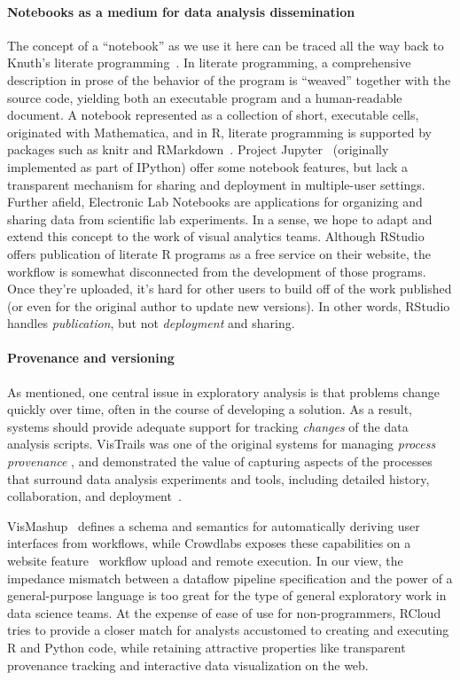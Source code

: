 \paragraph*{Notebooks as a medium for data analysis dissemination}
The concept of a ``notebook'' as we use it here can be traced all the
way back to Knuth's literate programming~\cite{Knuth:1984:LP}. In
literate programming, a comprehensive description in prose of the
behavior of the program is ``weaved'' together with the source code,
yielding both an executable program and a human-readable document.
A notebook represented as a collection of short, executable cells,
originated with Mathematica, and in R, literate programming is
supported by packages such as knitr and RMarkdown~\cite{Xie:2013:DDW}.
Project Jupyter~\cite{jupyter} (originally implemented as part of
IPython) offer some notebook features, but lack a transparent
mechanism for sharing and deployment in multiple-user settings.
%
Further afield, {Electronic Lab Notebooks} are applications for organizing
and sharing data from scientific lab experiments\cite{Rubacha:2011:ELN}.
In a sense, we hope to adapt and extend this concept to the work of
visual analytics teams.
%
Although RStudio offers publication of literate R programs as a free
service on their website, the workflow is somewhat disconnected from
the development of those programs. Once they're uploaded, it's hard
for other users to build off of the work published (or even for the
original author to update new versions). In other words, RStudio
handles \emph{publication}, but not \emph{deployment} and sharing.

\paragraph*{Provenance and versioning} As
mentioned, one central issue in exploratory analysis is that
problems change quickly over time, often in the course of developing a
solution. As a result, systems should provide adequate support for
tracking \emph{changes} of the data analysis scripts. VisTrails was
one of the original systems for managing \emph{process provenance} ,
and demonstrated the value of capturing aspects of the processes that
surround data analysis experiments and tools, including detailed
history, collaboration, and deployment~\cite{Callahan:2006:VVM}.

VisMashup~\cite{Santos:2009:VST} defines a schema and
semantics for automatically deriving user interfaces from workflows,
while Crowdlabs exposes these capabilities on a website
feature~\cite{Mates:2011:CSA} workflow upload and remote execution. In
our view, the impedance mismatch between a dataflow pipeline
specification and the power of a general-purpose language is too great
for the type of general exploratory work in data science teams. At the
expense of ease of use for non-programmers, RCloud tries to provide a
closer match for analysts accustomed to creating and executing R and
Python code, while retaining attractive properties like transparent
provenance tracking and interactive data visualization on the web.

